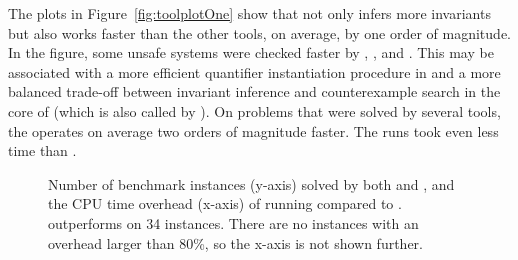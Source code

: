 The plots in Figure~\ref{fig:toolplotOne} show that \ringen{\cvc{}} not only infers more invariants but also works faster than the other tools, on average, by one order of magnitude. In the figure, some unsafe systems were checked faster by \cvcind{}, \vericat{}, and \racer{}. This may be associated with a more efficient quantifier instantiation procedure in \cvcind{} and a more balanced trade-off between invariant inference and counterexample search in the core of \racer{} (which is also called by \vericat{}).
On problems that were solved by several tools, the \ringen{\cvc} operates on average two orders of magnitude faster.
The \ringen{\vampire{}} runs took even less time than \ringen{\cvc}.

\begin{figure}
    \pgfplotsset{width=1.\textwidth,height=0.3\textheight}
    \pgfmathsetmacro\NRows{\pgfplotsretval}
        \centering
    \caption{ Number of benchmark instances (y-axis) solved by both \theringenCICI{} and \racer{}, and the CPU time overhead (x-axis) of running \theringenCICI{} compared to \racer{}. \racer{} outperforms \theringenCICI{} on 34 instances. There are no instances with an overhead larger than 80\%, so the x-axis is not shown further.}
    \label{fig:performance}
\end{figure}


